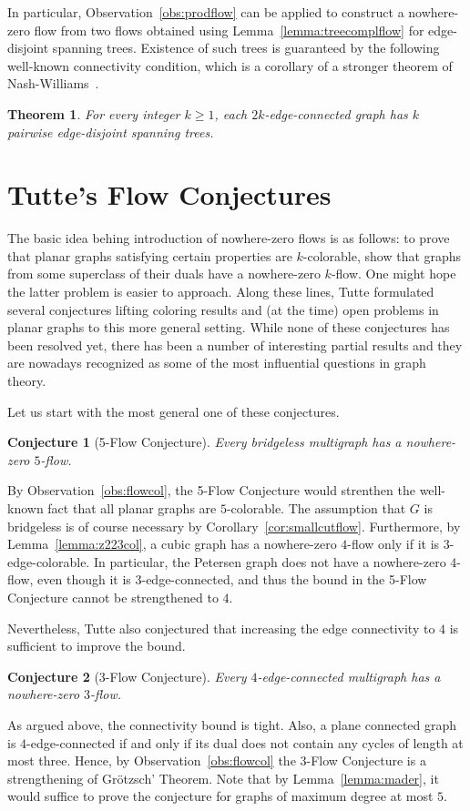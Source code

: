 \documentclass[12pt,twoside,openright,a4paper]{book}
\newtheorem{theorem}{Theorem}[chapter]
\newtheorem{conjecture}{Conjecture}[chapter]
\begin{document}
In particular, Observation~\ref{obs:prodflow} can be applied to construct a nowhere-zero flow from two flows obtained using
Lemma~\ref{lemma:treecomplflow} for edge-disjoint spanning trees.  Existence of such trees is guaranteed by the following
well-known connectivity condition, which is a corollary of a stronger theorem of Nash-Williams~\cite{nashwil}.

\begin{theorem}\label{thm:disjspanning}
For every integer $k\ge 1$, each $2k$-edge-connected graph has $k$ pairwise edge-disjoint spanning trees.
\end{theorem}

\section{Tutte's Flow Conjectures}

The basic idea behing introduction of nowhere-zero flows is as follows: to prove that planar graphs
satisfying certain properties are $k$-colorable, show that graphs from some superclass of their duals
have a nowhere-zero $k$-flow.  One might hope the latter problem is easier to approach.
Along these lines, Tutte formulated several conjectures lifting coloring results and (at the time) open problems
in planar graphs to this more general setting.  While none of these conjectures has been resolved yet, there
has been a number of interesting partial results and they are nowadays recognized as some of the most influential
questions in graph theory.

Let us start with the most general one of these conjectures.
\begin{conjecture}[5-Flow Conjecture]
Every bridgeless multigraph has a nowhere-zero $5$-flow.
\end{conjecture}
By Observation~\ref{obs:flowcol}, the 5-Flow Conjecture would strenthen the well-known fact that all planar graphs
are $5$-colorable.  The assumption that $G$ is bridgeless is of course necessary by Corollary~\ref{cor:smallcutflow}.
Furthermore, by Lemma~\ref{lemma:z223col}, a cubic graph has a nowhere-zero $4$-flow only if it is $3$-edge-colorable.
In particular, the Petersen graph does not have a nowhere-zero $4$-flow, even though it is $3$-edge-connected,
and thus the bound in the 5-Flow Conjecture cannot be strengthened to $4$.

Nevertheless, Tutte also conjectured that increasing the edge connectivity to $4$ is sufficient to improve the bound.
\begin{conjecture}[3-Flow Conjecture]
Every $4$-edge-connected multigraph has a nowhere-zero $3$-flow.
\end{conjecture}
As argued above, the connectivity bound is tight.  Also, a plane connected graph is $4$-edge-connected if and only if
its dual does not contain any cycles of length at most three.  Hence, by Observation~\ref{obs:flowcol} the 3-Flow Conjecture
is a strengthening of Gr\"{o}tzsch' Theorem.  Note that by Lemma~\ref{lemma:mader}, it would suffice to prove the conjecture
for graphs of maximum degree at most $5$.
\end{document}
